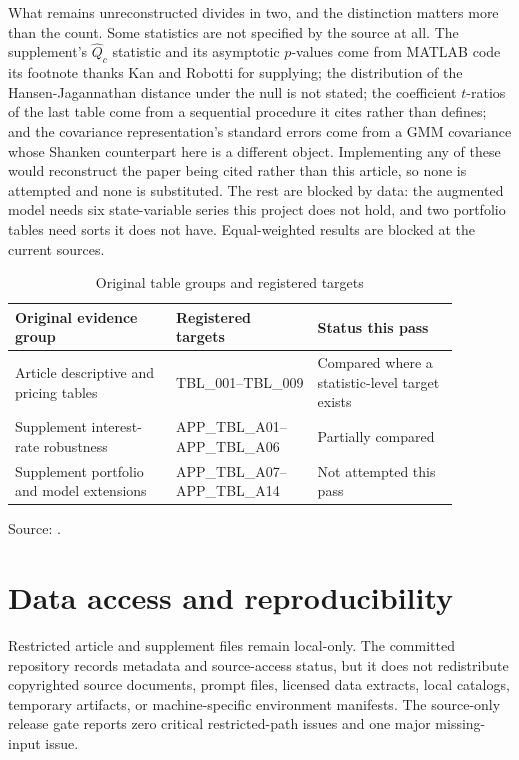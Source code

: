 \documentclass[11pt]{article}
\newcommand{\artifact}[1]{\path{#1}}
\begin{document}
What remains unreconstructed divides in two, and the distinction matters more
than the count. Some statistics are not specified by the source at all. The
supplement's $\widehat{Q}_c$ statistic and its asymptotic $p$-values come from
MATLAB code its footnote thanks Kan and Robotti for supplying; the distribution
of the Hansen-Jagannathan distance under the null is not stated; the
coefficient $t$-ratios of the last table come from a sequential procedure it
cites rather than defines; and the covariance representation's standard errors
come from a GMM covariance whose Shanken counterpart here is a different object.
Implementing any of these would reconstruct the paper being cited rather than
this article, so none is attempted and none is substituted. The rest are blocked
by data: the augmented model needs six state-variable series this project does
not hold, and two portfolio tables need sorts it does not have. Equal-weighted
results are blocked at the current sources. %

\begin{table}[htbp]
\centering
\caption{Original table groups and registered targets}
\begin{tabular}{p{0.32\linewidth}p{0.28\linewidth}p{0.28\linewidth}}
\toprule
Original evidence group & Registered targets & Status this pass \\
\midrule
Article descriptive and pricing tables & TBL\_001--TBL\_009 & Compared where a statistic-level target exists \\ %
Supplement interest-rate robustness & APP\_TBL\_A01--APP\_TBL\_A06 & Partially compared \\ %
Supplement portfolio and model extensions & APP\_TBL\_A07--APP\_TBL\_A14 & Not attempted this pass \\ %
\bottomrule
\end{tabular}

\smallskip
\small Source: \artifact{research/table_target_manifest.csv}.
\end{table}

\section{Data access and reproducibility}

Restricted article and supplement files remain local-only. The committed
repository records metadata and source-access status, but it does not redistribute
copyrighted source documents, prompt files, licensed data extracts, local
catalogs, temporary artifacts, or machine-specific environment manifests. The
source-only release gate reports zero critical restricted-path issues and one
major missing-input issue. %
\end{document}
